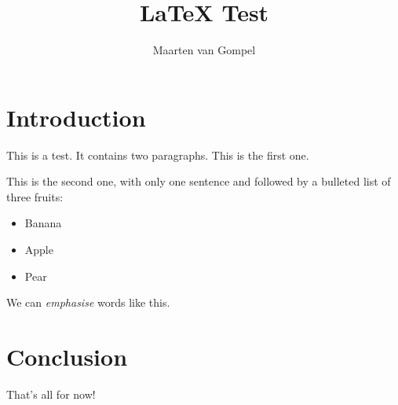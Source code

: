 \documentclass{article}
\begin{document}
\title{LaTeX Test}
\author{Maarten van Gompel}

\maketitle

\section{Introduction}

This is a test. It contains two paragraphs. This is the first one.

This is the second one, with only one sentence and followed by a bulleted list of three fruits:

\begin{itemize}
 \item Banana
 \item Apple
 \item Pear
\end{itemize}

We can \emph{emphasise} words like this.

\section{Conclusion}

That's all for now!
\end{document}
